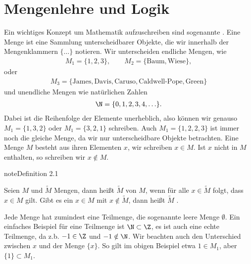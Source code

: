\documentclass[letterpaper,10pt,english]{jupyterBook}
\begin{document}
\section{Mengenlehre und Logik}
\label{\detokenize{grundlagen/mengenlogik:mengenlehre-und-logik}}\label{\detokenize{grundlagen/mengenlogik::doc}}
Ein wichtiges Konzept um Mathematik aufzuschreiben sind sogenannte . Eine Menge ist eine Sammlung unterscheidbarer Objekte, die wir innerhalb der Mengenklammern \(\{ \ldots \}\) notieren. Wir unterscheiden endliche Mengen, wie
\begin{equation*}
\begin{split} M_1 =  \{1,2,3\}, \qquad M_2=\{\text{Baum},\text{Wiese}\} ,\end{split}
\end{equation*}
oder
\begin{equation*}
\begin{split} M_3=\{\text{James}, \text{Davis}, \text{Caruso}, \text{Caldwell-Pope},\text{Green}\}\end{split}
\end{equation*}
und unendliche Mengen wie natürlichen Zahlen
\begin{equation*}
\begin{split}\N =\{0,1,2,3,4,\ldots\}.\end{split}
\end{equation*}
Dabei ist die Reihenfolge der Elemente unerheblich, also können wir genauso \( M_1 = \{1,3,2\}\) oder \(M_1=\{3,2,1\}\) schreiben. Auch \(M_1=\{1,2,2,3\}\) ist immer noch die gleiche Menge, da wir nur unterscheidbare Objekte betrachten.
Eine Menge \(M\) besteht aus ihren Elementen \(x\), wir schreiben \(x \in M\). Ist \(x\) nicht in \(M\) enthalten, so schreiben wir \(x \notin M\).
\label{grundlagen/mengenlogik:definition-0}
\begin{sphinxadmonition}{note}{Definition 2.1}



Seien \(M\) und \(\tilde M\) Mengen, dann heißt \(\tilde M\)  von \(M\), wenn für alle \(x \in \tilde M\) folgt, dass \(x \in M\) gilt. Gibt es ein \(x \in M\) mit \(x \notin \tilde M\), dann heißt \(\tilde M\) .
\end{sphinxadmonition}

Jede Menge hat zumindest eine Teilmenge, die sogenannte leere Menge \(\emptyset\). Ein einfaches Beispiel für eine Teilmenge ist \(\N \subset \Z\), es ist auch eine echte Teilmenge, da z.b. \(-1 \in \Z\) und \(-1 \notin \N\).
Wir beachten auch den Unterschied zwischen \(x\) und der Menge \(\{x\}\). So gilt im obigen Beispiel etwa \(1 \in M_1\), aber \(\{1\} \subset M_1\).
\end{document}
